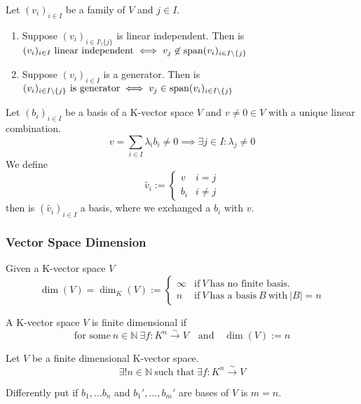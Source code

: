 \begin{lemma}\label{lem:extending_family}
   Let \((v_i)_{i \in I}\) be a family of \(V\) and \(j \in I\).
   \begin{enumerate}[label=\roman*, align=Center]
      \item Suppose \((v_i)_{i \in I \setminus \{j\}}\) is linear independent. Then is \((v_i)_{i \in I}~\text{linear independent} \iff v_j \not\in \operatorname{span}(v_i)_{i \in I \setminus \{j\}}\)
      \item Suppose \((v_i)_{i \in I}\) is a generator. Then is \((v_i)_{i \in I \setminus \{j\}}~\text{is generator} \iff v_j \in \operatorname{span}(v_i)_{i \in I \setminus \{j\}}\)
   \end{enumerate}
\end{lemma}

\begin{lemma}\label{lem:exchange}
   Let \((b_i)_{i \in I}\) be a basis of a K-vector space \(V\) and \(v \neq 0 \in V\) with a unique linear combination.
   \[v = \sum_{i \in I} \lambda_i b_i \neq 0 \implies \exists j \in I: \lambda_j \neq 0\]
   We define
   \[\tilde{v_i} := \begin{cases} v & i = j\\ b_i & i \neq j\end{cases}\]
   then is \((\tilde{v_i})_{i \in I}\) a basis, where we exchanged a \(b_i\) with \(v\).
\end{lemma}

\subsubsection{Vector Space Dimension}
\begin{definition}
   Given a K-vector space \(V\)
   \[\dim(V) = \dim_{K}(V) := \begin{cases}\infty & \text{if}~V~\text{has no finite basis.}\\n & \text{if}~V~\text{has a basis}~B~\text{with}~|B| = n\end{cases}\]
\end{definition}

\begin{definition}
   A K-vector space \(V\) is finite dimensional if
   \[\text{for some}~n \in \mathbb{N}~\exists f: K^n \xrightarrow{\sim} V \quad\text{and}\quad \dim(V) := n\]
\end{definition}

\begin{proposition}\label{pro:Kn_VS_isomorphism}
   Let \(V\) be a finite dimensional K-vector space.
   \[\exists! n \in \mathbb{N}~\text{such that}~\exists f: K^n \xrightarrow{\sim} V\]
\end{proposition}
\begin{remark}
   Differently put if \(b_1, \ldots b_n\) and \(b_1', \ldots, b_m'\) are bases of \(V\) is \(m = n\).
\end{remark}

